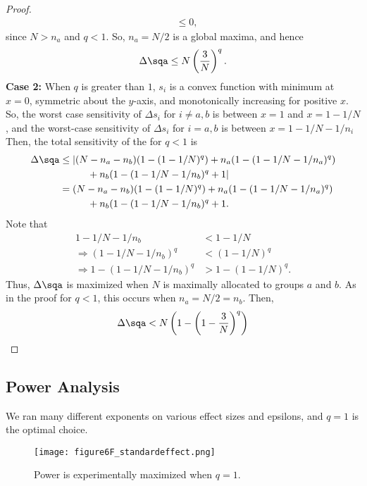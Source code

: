 \begin{proof}
\begin{align*}
	&\le 0,
\end{align*}
since $N>n_a$ and $q<1$. So, $n_a = N/2$ is a global maxima, and hence
%
$$\Delta\sqa \le N \left( \frac{3}{N} \right)^q.$$
\noindent\textbf{Case 2:} When $q$ is greater than $1$, $s_i$ is a convex function with minimum at $x=0$, symmetric about the $y$-axis, and monotonically increasing for positive $x$. So, the worst case sensitivity of $\Delta s_i$ for $i \ne a,b$ is between $x= 1$ and $x=1-1/N$, and the worst-case sensitivity of $\Delta s_i$ for $i=a,b$ is between $x = 1 - 1/N - 1/n_i$ Then, the total sensitivity of the \spa for $q<1$ is
%
\begin{align*}
\Delta\sqa &\le \vert (N-n_a-n_b)(1-(1-1/N)^q) + n_a(1-(1-1/N-1/n_a)^q) \\
	& \hspace{1cm} + n_b(1-(1-1/N-1/n_b)^q + 1\vert \\
	&= (N-n_a-n_b)(1-(1-1/N)^q) + n_a(1-(1-1/N-1/n_a)^q) \\
	& \hspace{1cm} + n_b(1-(1-1/N-1/n_b)^q + 1. 
\end{align*}
%
Note that 
%
\begin{align*}
1-1/N-1/n_b &< 1-1/N \\
\Rightarrow (1-1/N-1/n_b)^q &< (1-1/N)^q \\
\Rightarrow 1 - (1-1/N-1/n_b)^q &> 1- (1-1/N)^q.
\end{align*}
Thus, $\Delta\sqa$ is maximized when $N$ is maximally allocated to groups $a$ and $b$. As in the proof for $q<1$, this occurs when $n_a = N/2 = n_b$. Then, 
$$\Delta\sqa < N \left( 1 - \left( 1 - \frac{3}{N}\right)^q \right)$$
\end{proof}

\subsection{Power Analysis}
  We ran many different exponents on various effect sizes and epsilons, and $q=1$ is the optimal choice. 
\begin{figure}
\centering
\texttt{[image: figure6F\_standardeffect.png]}
\caption{Power is experimentally maximized when $q = 1$.}
\end{figure}

